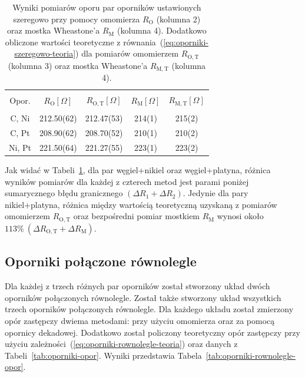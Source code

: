 \documentclass[twocolumn, a4paper, polish, 10pt]{article}
\newcommand{\RO}{\ensuremath{ R_{\mathrm{O}} }}
\newcommand{\RM}{\ensuremath{ R_{\mathrm{M}} }}
\newcommand{\ROT}{\ensuremath{ R_{\mathrm{O, T}} }}
\newcommand{\RMT}{\ensuremath{ R_{\mathrm{M, T}} }}
\begin{document}
\begin{table}[ht]
\begin{center}
\renewcommand*{\tablename}{Tabela}
\caption{\small
Wyniki pomiarów oporu par oporników ustawionych szeregowo przy pomocy omomierza $\RO$ (kolumna 2) oraz mostka Wheastone’a $\RM$ (kolumna 4).
Dodatkowo obliczone wartości teoretyczne z równania~(\ref{eq:oporniki-szeregowo-teoria}) dla pomiarów omomierzem $\ROT$ (kolumna 3) oraz mostka Wheastone’a $\RMT$ (kolumna 4).
\vspace{0.15cm}
    \label{tab:oporniki-szeregowo-opor}}
    {\small
    \begin{tabular}{c c c c c}
    \hline \vspace{-0.35cm} \\
      Opor. & $\RO[\Omega]$
      & $\ROT[\Omega]$
      & $\RM[\Omega]$
      & $\RMT[\Omega]$ \\
      \hline \vspace{-0.2cm} \\
      C,  Ni & 212.50(62) & 212.47(53) & 214(1) & 215(2) \\
      C,  Pt & 208.90(62) & 208.70(52) & 210(1) & 210(2) \\
      Ni, Pt & 221.50(64) & 221.27(55) & 223(1) & 223(2) \\
    \hline
    \end{tabular}}
    \end{center}
\end{table}

Jak widać w Tabeli~\ref{tab:oporniki-szeregowo-opor}, dla par węgiel+nikiel oraz węgiel+platyna, różnica wyników pomiarów dla każdej z czterech metod jest parami poniżej sumarycznego błędu granicznego ${(\Delta R_1 + \Delta R_2)}$.
Jedynie dla pary nikiel+platyna, różnica między wartością teoretyczną uzyskaną z pomiarów omomierzem $\ROT$ oraz bezpośredni pomiar mostkiem $\RM$ wynosi około ${113\%~(\Delta \ROT+\Delta \RM)}$.

\subsection{Oporniki połączone równolegle}
Dla każdej z trzech różnych par oporników został stworzony układ dwóch oporników połączonych równolegle. Został także stworzony układ wszystkich trzech oporników połączonych równolegle. Dla każdego układu został zmierzony opór zastępczy dwiema metodami: przy użyciu omomierza oraz za pomocą opornicy dekadowej. Dodatkowo został policzony teoretyczny opór zastępczy przy użyciu zależności~(\ref{eq:oporniki-rownolegle-teoria}) oraz danych z Tabeli~\ref{tab:oporniki-opor}. Wyniki przedstawia Tabela~\ref{tab:oporniki-rownolegle-opor}.
\end{document}
